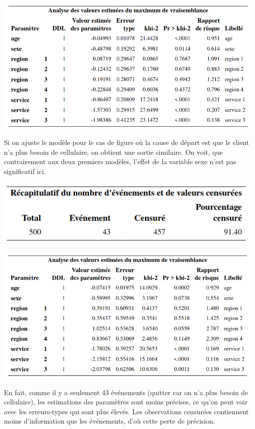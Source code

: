 \documentclass[
  11pt,
  letterpaper,
]{book}
\theoremstyle{definition}
\theoremstyle{definition}
\theoremstyle{definition}
\theoremstyle{remark}
\begin{document}
\begin{center}\includegraphics[width=0.85\linewidth]{figures/05-survie-e27} \end{center}

Si on ajuste le modèle pour le cas de figure où la cause de départ est que le client n'a plus besoin de cellulaire, on obtient une sortie similaire. On voit, que contrairement aux deux premiers modèles, l'effet de la variable sexe n'est pas significatif ici.

\begin{center}\includegraphics[width=0.65\linewidth]{figures/05-survie-e28} \end{center}

\begin{center}\includegraphics[width=0.85\linewidth]{figures/05-survie-e29} \end{center}

En fait, comme il y a seulement 43 événements (quitter car on n'a plus besoin de cellulaire), les estimations des paramètres sont moins précises, ce qu'on peut voir avec les erreurs-types qui sont plus élevés. Les observations censurées contiennent moins d'information que les événements, d'où cette perte de précision.
\end{document}
